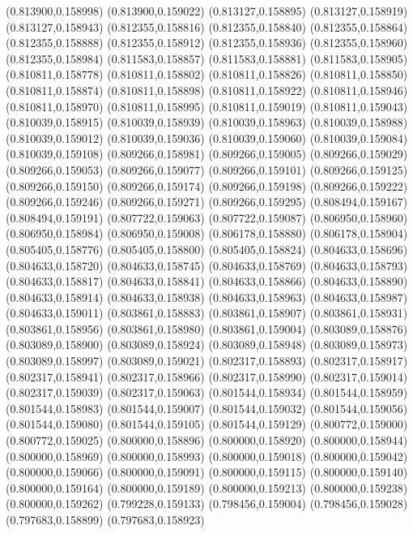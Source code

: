 (0.813900,0.158998)
(0.813900,0.159022)
(0.813127,0.158895)
(0.813127,0.158919)
(0.813127,0.158943)
(0.812355,0.158816)
(0.812355,0.158840)
(0.812355,0.158864)
(0.812355,0.158888)
(0.812355,0.158912)
(0.812355,0.158936)
(0.812355,0.158960)
(0.812355,0.158984)
(0.811583,0.158857)
(0.811583,0.158881)
(0.811583,0.158905)
(0.810811,0.158778)
(0.810811,0.158802)
(0.810811,0.158826)
(0.810811,0.158850)
(0.810811,0.158874)
(0.810811,0.158898)
(0.810811,0.158922)
(0.810811,0.158946)
(0.810811,0.158970)
(0.810811,0.158995)
(0.810811,0.159019)
(0.810811,0.159043)
(0.810039,0.158915)
(0.810039,0.158939)
(0.810039,0.158963)
(0.810039,0.158988)
(0.810039,0.159012)
(0.810039,0.159036)
(0.810039,0.159060)
(0.810039,0.159084)
(0.810039,0.159108)
(0.809266,0.158981)
(0.809266,0.159005)
(0.809266,0.159029)
(0.809266,0.159053)
(0.809266,0.159077)
(0.809266,0.159101)
(0.809266,0.159125)
(0.809266,0.159150)
(0.809266,0.159174)
(0.809266,0.159198)
(0.809266,0.159222)
(0.809266,0.159246)
(0.809266,0.159271)
(0.809266,0.159295)
(0.808494,0.159167)
(0.808494,0.159191)
(0.807722,0.159063)
(0.807722,0.159087)
(0.806950,0.158960)
(0.806950,0.158984)
(0.806950,0.159008)
(0.806178,0.158880)
(0.806178,0.158904)
(0.805405,0.158776)
(0.805405,0.158800)
(0.805405,0.158824)
(0.804633,0.158696)
(0.804633,0.158720)
(0.804633,0.158745)
(0.804633,0.158769)
(0.804633,0.158793)
(0.804633,0.158817)
(0.804633,0.158841)
(0.804633,0.158866)
(0.804633,0.158890)
(0.804633,0.158914)
(0.804633,0.158938)
(0.804633,0.158963)
(0.804633,0.158987)
(0.804633,0.159011)
(0.803861,0.158883)
(0.803861,0.158907)
(0.803861,0.158931)
(0.803861,0.158956)
(0.803861,0.158980)
(0.803861,0.159004)
(0.803089,0.158876)
(0.803089,0.158900)
(0.803089,0.158924)
(0.803089,0.158948)
(0.803089,0.158973)
(0.803089,0.158997)
(0.803089,0.159021)
(0.802317,0.158893)
(0.802317,0.158917)
(0.802317,0.158941)
(0.802317,0.158966)
(0.802317,0.158990)
(0.802317,0.159014)
(0.802317,0.159039)
(0.802317,0.159063)
(0.801544,0.158934)
(0.801544,0.158959)
(0.801544,0.158983)
(0.801544,0.159007)
(0.801544,0.159032)
(0.801544,0.159056)
(0.801544,0.159080)
(0.801544,0.159105)
(0.801544,0.159129)
(0.800772,0.159000)
(0.800772,0.159025)
(0.800000,0.158896)
(0.800000,0.158920)
(0.800000,0.158944)
(0.800000,0.158969)
(0.800000,0.158993)
(0.800000,0.159018)
(0.800000,0.159042)
(0.800000,0.159066)
(0.800000,0.159091)
(0.800000,0.159115)
(0.800000,0.159140)
(0.800000,0.159164)
(0.800000,0.159189)
(0.800000,0.159213)
(0.800000,0.159238)
(0.800000,0.159262)
(0.799228,0.159133)
(0.798456,0.159004)
(0.798456,0.159028)
(0.797683,0.158899)
(0.797683,0.158923)
